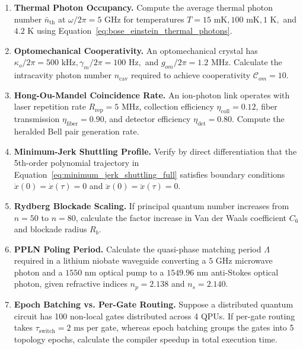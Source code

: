 \begin{enumerate}[label=\textbf{2.\arabic*.}]
    \item \textbf{Thermal Photon Occupancy.} Compute the average thermal photon number $\bar{n}_{\text{th}}$ at $\omega/2\pi = 5\text{ GHz}$ for temperatures $T = 15\text{ mK}, 100\text{ mK}, 1\text{ K},$ and $4.2\text{ K}$ using Equation~\ref{eq:bose_einstein_thermal_photons}.
    \item \textbf{Optomechanical Cooperativity.} An optomechanical crystal has $\kappa_o / 2\pi = 500\text{ kHz}, \gamma_m / 2\pi = 100\text{ Hz},$ and $g_{om} / 2\pi = 1.2\text{ MHz}$. Calculate the intracavity photon number $n_{\text{cav}}$ required to achieve cooperativity $\mathcal{C}_{om} = 10$.
    \item \textbf{Hong-Ou-Mandel Coincidence Rate.} An ion-photon link operates with laser repetition rate $R_{\text{rep}} = 5\text{ MHz}$, collection efficiency $\eta_{\text{coll}} = 0.12$, fiber transmission $\eta_{\text{fiber}} = 0.90$, and detector efficiency $\eta_{\text{det}} = 0.80$. Compute the heralded Bell pair generation rate.
    \item \textbf{Minimum-Jerk Shuttling Profile.} Verify by direct differentiation that the 5th-order polynomial trajectory in Equation~\ref{eq:minimum_jerk_shuttling_full} satisfies boundary conditions $\dot{x}(0)=\dot{x}(\tau)=0$ and $\ddot{x}(0)=\ddot{x}(\tau)=0$.
    \item \textbf{Rydberg Blockade Scaling.} If principal quantum number increases from $n = 50$ to $n = 80$, calculate the factor increase in Van der Waals coefficient $C_6$ and blockade radius $R_b$.
    \item \textbf{PPLN Poling Period.} Calculate the quasi-phase matching period $\Lambda$ required in a lithium niobate waveguide converting a $5\text{ GHz}$ microwave photon and a $1550\text{ nm}$ optical pump to a $1549.96\text{ nm}$ anti-Stokes optical photon, given refractive indices $n_p = 2.138$ and $n_s = 2.140$.
    \item \textbf{Epoch Batching vs. Per-Gate Routing.} Suppose a distributed quantum circuit has 100 non-local gates distributed across 4 QPUs. If per-gate routing takes $\tau_{\text{switch}} = 2\text{ ms}$ per gate, whereas epoch batching groups the gates into 5 topology epochs, calculate the compiler speedup in total execution time.
\end{enumerate}
